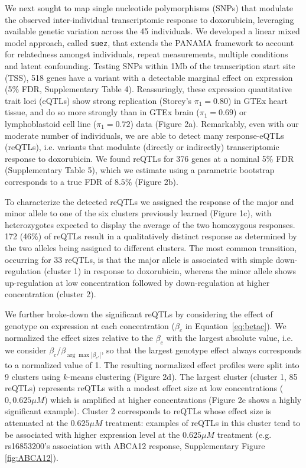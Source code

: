 \documentclass{article}
\begin{document}
We next sought to map single nucleotide polymorphisms (SNPs) that modulate the observed inter-individual transcriptomic response to doxorubicin, leveraging available genetic variation across the 45 individuals\cite{Livne2015}. We developed a linear mixed model approach, called \texttt{suez}, that extends the PANAMA framework\citep{Fusi2012} to account for relatedness amongst individuals, repeat measurements, multiple conditions and latent confounding. Testing SNPs within 1Mb of the transcription start site (TSS), 518 genes have a variant with a detectable marginal effect on expression (5\% FDR, Supplementary Table 4). Reassuringly, these expression quantitative trait loci (eQTLs) show strong replication (Storey's $\pi_1=0.80$) in GTEx heart tissue, and do so more strongly than in GTEx brain ($\pi_1=0.69$) or lymphoblastoid cell line ($\pi_1=0.72$) data (Figure 2a). Remarkably, even with our moderate number of individuals, we are able to detect many response-eQTLs (reQTLs), i.e. variants that modulate (directly or indirectly) transcriptomic response to doxorubicin. We found reQTLs for 376 genes at a nominal 5\% FDR (Supplementary Table 5), which we estimate using a parametric bootstrap corresponds to a true FDR of $8.5\%$ (Figure 2b). 

To characterize the detected reQTLs we assigned the response of the major and minor allele to one of the six clusters previously learned (Figure 1c), with heterozygotes expected to display the average of the two homozygous responses. 172 (46\%) of reQTLs result in a qualitatively distinct response as determined by the two alleles being assigned to different clusters. The most common transition, occurring for 33 reQTLs, is that the major allele is associated with simple down-regulation (cluster 1) in response to doxorubicin, whereas the minor allele shows up-regulation at low concentration followed by down-regulation at higher concentration (cluster 2). 

We further broke-down the significant reQTLs by considering the effect of genotype on expression at each concentration ($\beta_c$ in Equation~\ref{eq:betac}). We normalized the effect sizes relative to the $\beta_c$ with the largest absolute value, i.e. we consider $\beta_c / \beta_{\arg \max{ |\beta_{c'}| }} $, so that the largest genotype effect always corresponds to a normalized value of 1. The resulting normalized effect profiles were split into 9 clusters using $k$-means clustering (Figure 2d). The largest cluster (cluster 1, 85 reQTLs) represents reQTLs with a modest effect size at low concentrations ($0,0.625\mu M$) which is amplified at higher concentrations (Figure 2e shows a highly significant example). Cluster 2 corresponds to reQTLs whose effect size is attenuated at the $0.625\mu M$ treatment: examples of reQTLs in this cluster tend to be associated with higher expression level at the $0.625\mu M$ treatment (e.g. rs16853200's association with ABCA12 response, Supplementary Figure \ref{fig:ABCA12}). 
\end{document}
